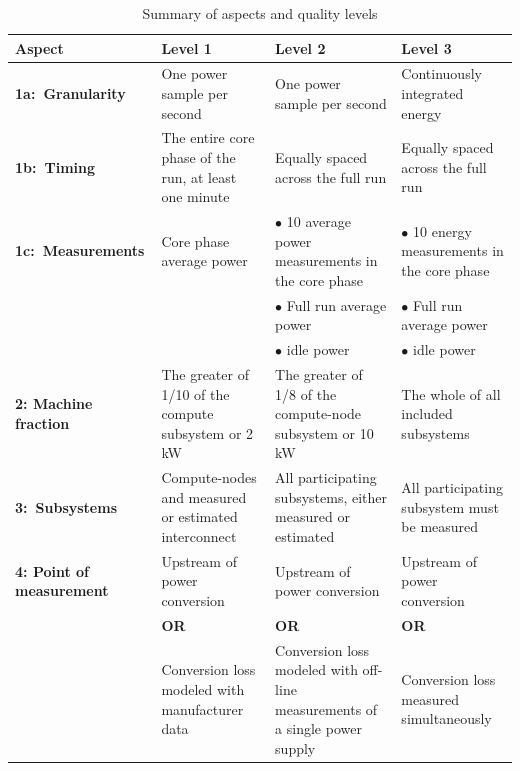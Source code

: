 \noindent
\begin{table}
\caption{Summary of aspects and quality levels}
\label{tab:levels}
\begin{tabular}{|p{3.0cm}|p{3.5cm}|p{3.5cm}|p{3.5cm}|} \hline
\textbf{Aspect}&\textbf{Level 1}&\textbf{Level 2}&\textbf{Level 3}\\ \hline

\textbf{1a:~Granularity} &
One power sample per second &
One power sample per second &
Continuously integrated energy\\
\hline


\textbf{1b:~Timing} &
The entire core phase of the run, at least one minute &
Equally spaced across the full run &
Equally spaced across the full run   \\
\hline

\textbf{1c:~Measurements} &
Core phase average power &
$\bullet$ 10 average power measurements in the core phase &
$\bullet$  10 energy measurements in the core phase\\

 & &
$\bullet$  Full run average power &
$\bullet$  Full run average power \\

 & &
$\bullet$  idle power &
$\bullet$  idle power \\
\hline

\textbf{2: Machine \newline fraction}  &
The greater of 1/10 of the compute subsystem or 2 kW  &
The greater of 1/8 of the compute-node subsystem or 10 kW  &
The whole of all included subsystems \\
\hline

\textbf{3:~Subsystems} &
Compute-nodes and measured or estimated interconnect &
All participating subsystems, either measured or estimated &
All participating subsystem must be measured \\
\hline

\textbf{4: Point of measurement} &
Upstream of power conversion &
Upstream of power conversion &
Upstream of power conversion\\

 &
\centering \textbf{OR} &
\centering \textbf{OR} &
\centering \textbf{OR} \tabularnewline

 &
Conversion loss modeled with manufacturer data &
Conversion loss modeled with off-line measurements of a single power supply &
Conversion loss measured simultaneously \\
\hline
\end{tabular}
\end{table}


